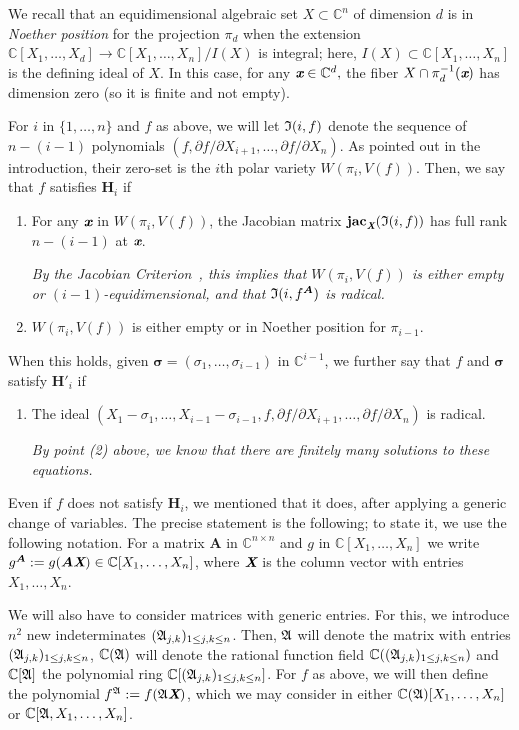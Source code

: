 \documentclass[sigconf]{acmart}
\def\Xb{\textit{\textbf{X}}}
\def\mA{{\bm A}}
\def\xb{\textit{\textbf{x}}}
\def\C{\mathbb{C}}
\def\jac{ \textbf{jac}}
\def\pa{\partial}
\def\I{\frak{I}}
\def\A{\frak{A}}
\begin{document}
We recall that an equidimensional algebraic set $X \subset \C^n$ of
dimension $d$ is in \textit{Noether position} for the projection
$\pi_d$ when the extension $\C[X_1,\hdots,X_d] \rightarrow
\C[X_1,\hdots,X_n]/I(X)$ is integral; here, $I(X) \subset
\C[X_1,\dots,X_n]$ is the defining ideal of $X$. In this case, for any
$\xb \in \C^d,$ the fiber $X \cap \pi_d^{-1}(\xb)$ has dimension zero
(so it is finite and not empty).

For $i$ in $\{1,\dots,n\}$ and $f$ as above, we will let $\I(i, f)$
denote the sequence of $n-(i-1)$ polynomials $(f, {\pa f}/{\pa
  X_{i+1}},\dots,{\pa f}/{\pa X_n})$. As pointed out in the
introduction, their zero-set is the $i$th polar variety
$W(\pi_i,V(f))$.  Then, we say that $f$ satisfies $\textbf{H}_i$ if
\begin{enumerate}
\item For any $\xb$ in $W(\pi_i,V(f))$, the Jacobian matrix
  $\jac_\Xb(\I(i, f))$ has full rank $n-(i-1)$ at $\xb$.

  {\em By the Jacobian Criterion~\cite[Corollary 16.20]{ECA}, this
  implies that $W(\pi_i,V(f))$ is either empty or $(i-1)$-equidimensional,
  and that $\I(i, f^\mA)$ is radical.}

\smallskip

\item $W(\pi_i,V(f))$ is either empty or in Noether position for
  $\pi_{i-1}$.
\end{enumerate}
When this holds, given $\bm \sigma = (\sigma_1,\hdots,\sigma_{i-1})$
in $\C^{i-1}$, we further say that $f$ and $\bm \sigma$ satisfy
$\textbf{H}'_i$ if
\begin{enumerate}
\item The ideal  $(X_1-\sigma_1,\dots,X_{i-1}-\sigma_{i-1},f, {\pa f}/{\pa
  X_{i+1}},\dots,{\pa f}/{\pa X_n})$ is
  radical.

  {\em By point (2) above, we know that there are finitely many solutions 
    to these equations.}
\end{enumerate}

Even if $f$ does not satisfy $\textbf{H}_i$, we mentioned that it
does, after applying a generic change of variables. The precise
statement is the following; to state it, we use the following
notation. For a matrix $\mA$ in $\C^{n\times n}$ and $g$ in
$\C[X_1,\hdots,X_n]$ we write $g^\mA:=g(\mA \Xb) \in
\C[X_1,\dots,X_n]$, where $\Xb$ is the column vector with entries
$X_1,\dots,X_n$.

We will also have to consider matrices with generic entries. For this,
we introduce $n^2$ new indeterminates $(\frak A_{j,k})_{1\le j,k \le
  n}$. Then, $\A$ will denote the matrix with entries $(\frak
A_{j,k})_{1\le j,k \le n}$, $\C(\A)$ will denote the rational function
field $\C((\frak A_{j,k})_{1\le j,k \le n})$ and $\C[\A]$ the
polynomial ring $\C[(\frak A_{j,k})_{1\le j,k \le n}]$.  For $f$ as
above, we will then define the polynomial $f^\A:=f(\A \Xb)$, 
which we may consider in either
$\C(\A)[X_1,\dots,X_n]$ or $\C[\A,X_1,\dots,X_n]$.
\end{document}
